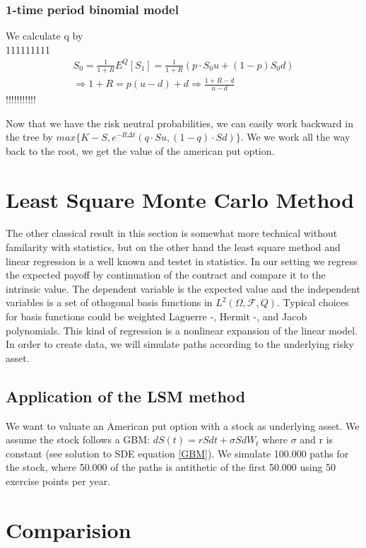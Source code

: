 \subsubsection{1-time period binomial model}
We calculate q by\\
111111111
\begin{equation}
\begin{split}
S_0=\frac{1}{1+R} E^Q[S_1]=\frac{1}{1+R} (p\cdot S_0 u + (1-p) S_0 d)\\
\Rightarrow 1+R=p(u-d)+d \Rightarrow \frac{1+R-d}{u-d}  
\end{split}
\end{equation} 
!!!!!!!!!!!

Now that we have the risk neutral probabilities, we can easily work backward in the tree by $max\{ K-S, e^{-R \Delta t} (q\cdot Su, (1-q)\cdot Sd) \}$. We we work all the way back to the root, we get the value of the american put option.




\section{Least Square Monte Carlo Method}
The other classical result in this section is somewhat more technical without familarity with statistics, but on the other hand the least square method and linear regression is a well known and testet in statistics. In our setting we regress the expected payoff by continuation of the contract and compare it to the intrinsic value. The dependent variable is the expected value and the independent variables is a set of othogonal basis functions in $L^2(\Omega, \mathcal{F}, Q)$. Typical choices for basis functions could be weighted Laguerre -, Hermit -, and Jacob polynomials. This kind of regression is a nonlinear expansion of the linear model. In order to create data, we will simulate paths according to the underlying risky asset. 

\subsection{Application of the LSM method}
We want to valuate an American put option with a stock as underlying asset. We assume the stock follows a GBM: $dS(t)=rSdt + \sigma S dW_t$ where $\sigma$ and r is constant (see solution to SDE equation \ref{GBM}). We simulate 100.000 paths for the stock, where 50.000 of the paths is antithetic of the first 50.000 using 50 exercise points per year.

\parencite{lsm}  

\section{Comparision}

